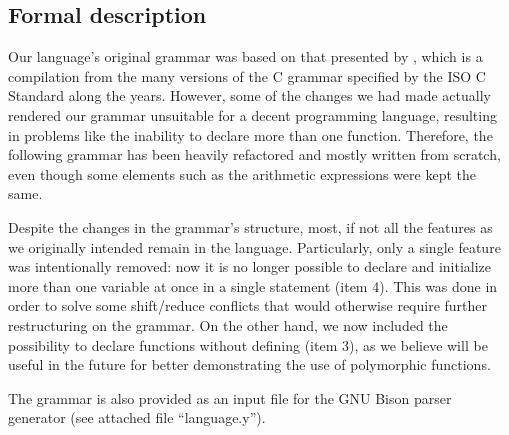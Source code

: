 \documentclass[12pt]{article}
\begin{document}
\subsection{Formal description}

Our language's original grammar was based on that presented by \textcite{Harbison2002},
which is a compilation from the many versions of the C grammar specified by the ISO C Standard
along the years. However, some of the changes we had made actually rendered our grammar
unsuitable for a decent programming language, resulting in problems like the inability
to declare more than one function. Therefore, the following grammar has been heavily
refactored and mostly written from scratch, even though some elements such as the arithmetic
expressions were kept the same.

Despite the changes in the grammar's structure, most, if not all the features as we originally intended
remain in the language. Particularly, only a single feature was intentionally removed: now it is no
longer possible to declare and initialize more than one variable at once in a single statement (item 4).
This was done in order to solve some shift/reduce conflicts that would otherwise require further
restructuring on the grammar. On the other hand, we now included the possibility to declare functions
without defining (item 3), as we believe will be useful in the future for better demonstrating
the use of polymorphic functions.

The grammar is also provided as an input file for the GNU Bison \cite{BISON} parser generator
(see attached file ``language.y'').
\end{document}
